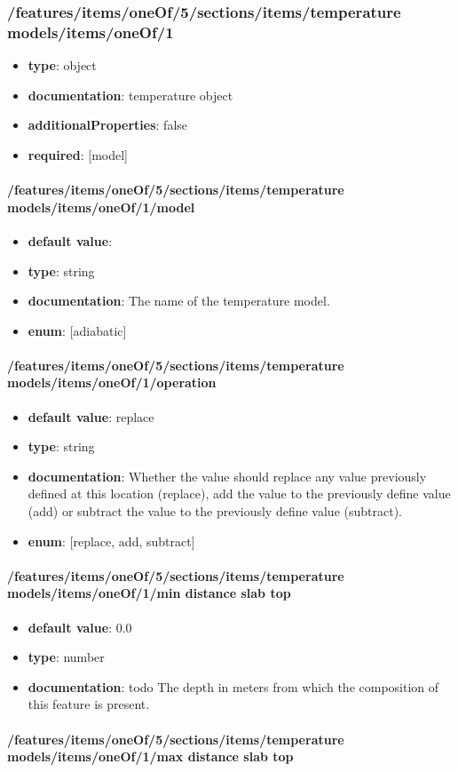 \subsubsection{/features/items/oneOf/5/sections/items/temperature models/items/oneOf/1}
\begin{itemize}\item {\bf type}: object
\item {\bf documentation}: temperature object
\item {\bf additionalProperties}: false
\item {\bf required}: [model]\end{itemize}
\paragraph{/features/items/oneOf/5/sections/items/temperature models/items/oneOf/1/model}
\begin{itemize}\item {\bf default value}: 
\item {\bf type}: string
\item {\bf documentation}: The name of the temperature model.
\item {\bf enum}: [adiabatic]\end{itemize}\paragraph{/features/items/oneOf/5/sections/items/temperature models/items/oneOf/1/operation}
\begin{itemize}\item {\bf default value}: replace
\item {\bf type}: string
\item {\bf documentation}: Whether the value should replace any value previously defined at this location (replace), add the value to the previously define value (add) or subtract the value to the previously define value (subtract).
\item {\bf enum}: [replace, add, subtract]\end{itemize}\paragraph{/features/items/oneOf/5/sections/items/temperature models/items/oneOf/1/min distance slab top}
\begin{itemize}\item {\bf default value}: 0.0
\item {\bf type}: number
\item {\bf documentation}: todo The depth in meters from which the composition of this feature is present.
\end{itemize}\paragraph{/features/items/oneOf/5/sections/items/temperature models/items/oneOf/1/max distance slab top}
